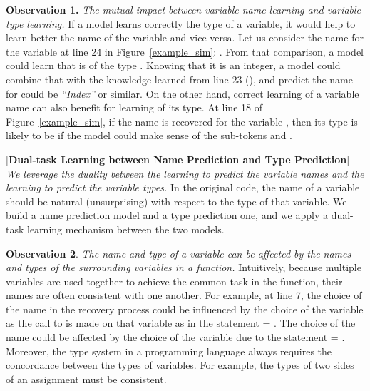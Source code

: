 \vspace{2pt} \textbf{Observation 1.} {\em The mutual impact between
  variable name learning and variable type learning.} If a model
learns correctly the type of a variable, it would help to learn better
the name of the variable and vice versa. Let us consider the name
 for the variable  at line 24 in
Figure~\ref{example_sim}: . From that comparison, a
model could learn that  is of the type . Knowing
that it is an integer, a model could combine that with the knowledge
learned from line 23 (), and predict the
name for  could be {\em ``Index''} or similar. On
the other hand, correct learning of a variable name can also benefit
for learning of its type. At line 18 of Figure~\ref{example_sim}, if
the name  is recovered for the variable
, then its type is likely to be  if the model could
make sense of the sub-tokens  and .

\vspace{2pt}  [{\bf Dual-task Learning
    between Name Prediction and Type Prediction}] {\em We leverage the
  duality between the learning to predict the variable names and the
  learning to predict the variable types.} In the original code, the
name of a variable should be natural (unsurprising) with respect to
the type of that variable. We build a name prediction model and a type
prediction one, and we apply a dual-task learning mechanism between
the two models.

\vspace{2pt}
\textbf{Observation 2}. {\em The name and type of a variable can be
  affected by the names and types of the surrounding variables in a
  function.}  Intuitively, because multiple variables are used
together to achieve the common task in the function, their names are
often consistent with one another. For example, at line 7, the choice
of the name  in the recovery process could be influenced
by the choice of the variable  as the call to
 is made on that variable as in the statement
 = . The choice of the name
 could be affected by the choice of the
variable  due to the statement  =
. Moreover, the type system in a programming
language always requires the concordance between the types of
variables. For example, the types of two sides of an assignment must
be consistent.

